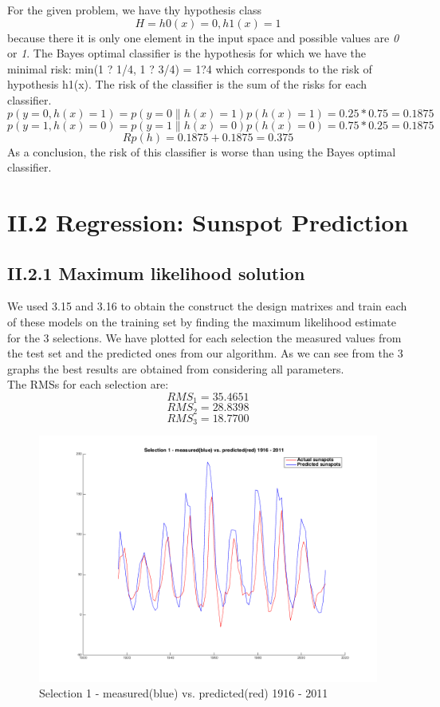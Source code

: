 \documentclass{article}      %
\begin{document}
For the given problem, we have thy hypothesis class 
\[H={h0(x)=0, h1(x)=1} \]
 because there it is only one element in the input space and possible values are \emph{0} or \emph{1}. The Bayes optimal classifier is the hypothesis for which we have the minimal risk: min({1 ? 1/4, 1 ? 3/4}) = 1?4 which corresponds to the risk of hypothesis h1(x). The risk of the classifier is the sum of the risks for each classifier. 
\[p(y=0, h(x)=1) = p(y=0 \| h(x)=1)p(h(x)=1) = 0.25 * 0.75 = 0.1875\] 
\[p(y=1, h(x)=0) = p(y=1 \| h(x)=0)p(h(x)=0) = 0.75 * 0.25 = 0.1875\] 
\[Rp(h) = 0.1875 + 0.1875 = 0.375\] 
As a conclusion, the risk of this classifier is worse than using the Bayes optimal classifier.\\
\section*{II.2 Regression: Sunspot Prediction}

\subsection*{II.2.1 Maximum likelihood solution}

We used 3.15 and 3.16 to obtain the construct the design matrixes and train each of these models on the training set by finding the maximum likelihood estimate for the 3 selections. We have plotted for each selection the measured values from the test set and the predicted ones from our algorithm. As we can see from the 3 graphs the best results are obtained from considering all parameters.\\

The RMSs for each selection are: \\
\[ RMS_1 = 35.4651\]
\[ RMS_2 = 28.8398\]
\[ RMS_3 = 18.7700\]


\begin{figure}[ht]
\centering
\includegraphics[scale=.4]{img/pred1}
\caption{Selection 1 - measured(blue) vs. predicted(red) 1916 - 2011 \label{overflow}}
\end{figure}
\end{document}
